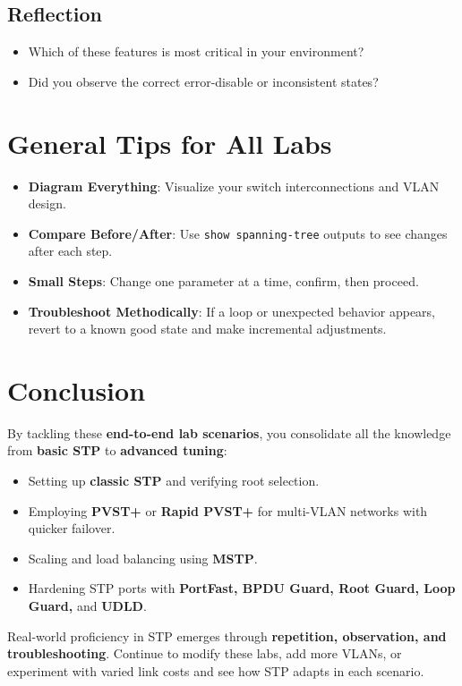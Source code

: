 \documentclass[a4paper]{report}
\begin{document}
\subsection{Reflection}
\begin{itemize}
    \item Which of these features is most critical in your environment?
    \item Did you observe the correct error-disable or inconsistent states?
\end{itemize}

\section{General Tips for All Labs}
\begin{itemize}
    \item \textbf{Diagram Everything}: Visualize your switch interconnections and VLAN design.
    \item \textbf{Compare Before/After}: Use \texttt{show spanning-tree} outputs to see changes after each step.
    \item \textbf{Small Steps}: Change one parameter at a time, confirm, then proceed.
    \item \textbf{Troubleshoot Methodically}: If a loop or unexpected behavior appears, revert to a known good state and make incremental adjustments.
\end{itemize}

\section{Conclusion}
By tackling these \textbf{end-to-end lab scenarios}, you consolidate all the knowledge from \textbf{basic STP} to \textbf{advanced tuning}:
\begin{itemize}
    \item Setting up \textbf{classic STP} and verifying root selection.
    \item Employing \textbf{PVST+} or \textbf{Rapid PVST+} for multi-VLAN networks with quicker failover.
    \item Scaling and load balancing using \textbf{MSTP}.
    \item Hardening STP ports with \textbf{PortFast, BPDU Guard, Root Guard, Loop Guard,} and \textbf{UDLD}.
\end{itemize}

Real-world proficiency in STP emerges through \textbf{repetition, observation, and troubleshooting}. Continue to modify these labs, add more VLANs, or experiment with varied link costs and see how STP adapts in each scenario.
\end{document}
